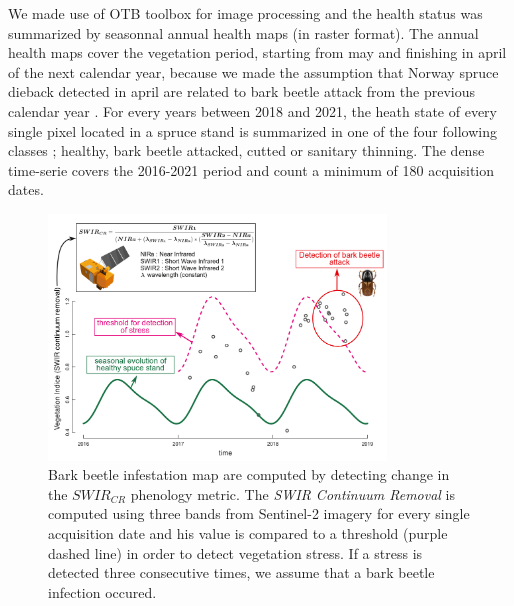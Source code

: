 \documentclass[3p,procedia]{elsarticle}
\begin{document}
We made use of OTB toolbox \citep{grizonnet_2017_OTB} for image processing and the health status was summarized by seasonnal annual health maps (in raster format).
The annual health maps cover the vegetation period, starting from may and finishing in april of the next calendar year, because we made the assumption that Norway spruce dieback detected in april are related to bark beetle attack from the previous calendar year \citep{muller_features_2022}.
For every years between 2018 and 2021, the heath state of every single pixel located in a spruce stand is summarized in one of the four following classes ; healthy, bark beetle attacked, cutted or sanitary thinning.
The dense time-serie covers the 2016-2021 period and count a minimum of 180 acquisition dates. 


\begin{figure}[htbp] 
	\centering
	\includegraphics[width=0.8\textwidth]{fctHarmo.png}
	\caption{Bark beetle infestation map are computed by detecting change in the $SWIR_{CR}$ phenology metric. The \textit{SWIR Continuum Removal} is computed using three bands from Sentinel-2 imagery for every single acquisition date and his value is compared to a threshold (purple dashed line) in order to detect vegetation stress. If a stress is detected three consecutive times, we assume that a bark beetle infection occured.}
	\label{fig:harmo}
\end{figure}
\end{document}
